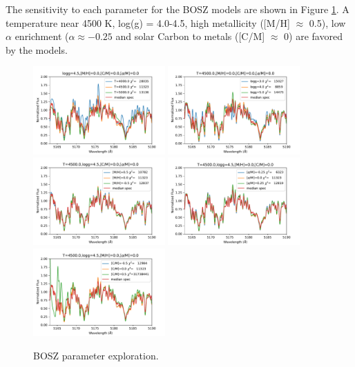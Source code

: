 \documentclass[twocolumn]{aastex61}
\begin{document}
The sensitivity to each parameter for the BOSZ models are shown in Figure \ref{fig:boszModelParamsMedianSpec}.
A temperature near 4500 K, log(g) = 4.0-4.5, high metallicity ([M/H] $\approx$ 0.5), low $\alpha$ enrichment ($\alpha \approx -0.25$ and solar Carbon to metals ([C/M] $\approx$ 0) are favored by the models.

\begin{figure}[!hbtp]
\begin{centering}
\includegraphics[width=0.45\textwidth]{images/bosz_model_exploration/T_EFF_exploration.pdf}
\includegraphics[width=0.45\textwidth]{images/bosz_model_exploration/LOGG_exploration}
\includegraphics[width=0.45\textwidth]{images/bosz_model_exploration/MH_exploration.pdf}
\includegraphics[width=0.45\textwidth]{images/bosz_model_exploration/ALPHA_exploration.pdf}
\includegraphics[width=0.45\textwidth]{images/bosz_model_exploration/CM_exploration.pdf}
\caption{BOSZ parameter exploration.}\label{fig:boszModelParamsMedianSpec}
\end{centering}
\end{figure}
\end{document}
